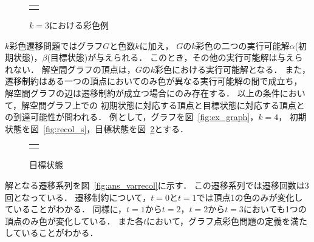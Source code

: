 \begin{figure}[htbp]
  \centering
  \begin{tabular}{c}
    
    \begin{minipage}{0.45\hsize}
      \centering
      
      \caption{グラフ}
      \label{fig:ex_graph}
    \end{minipage}

    \begin{minipage}{0.45\hsize}
      \centering
      
      \caption{$k=3$における彩色例}
      \label{fig:graph_col}
    \end{minipage}

  \end{tabular}  
\end{figure}

$k$彩色遷移問題ではグラフ$G$と色数$k$に加え，
$G$の$k$彩色の二つの実行可能解$\alpha$(初期状態)，$\beta$(目標状態)が与えられる． 
このとき，その他の実行可能解は与えられない． 
解空間グラフの頂点は，$G$の$k$彩色における実行可能解となる．
また，遷移制約はある一つの頂点においてのみ色が異なる実行可能解の間で成立ち，
解空間グラフの辺は遷移制約が成立つ場合にのみ存在する．
以上の条件において，解空間グラフ上での
初期状態に対応する頂点と目標状態に対応する頂点との到達可能性が問われる． 
例として，グラフを図~\ref{fig:ex_graph}，$k=4$，
初期状態を図~\ref{fig:recol_s}，目標状態を図~\ref{fig:recol_g}とする．

\begin{figure}[htbp]
  \centering
  \begin{tabular}{c}

    \begin{minipage}{0.45\hsize}
      \centering
      
      \caption{初期状態}
      \label{fig:recol_s}
    \end{minipage}

    \begin{minipage}{0.45\hsize}
      \centering
      
      \caption{目標状態}
      \label{fig:recol_g}
    \end{minipage}
    
  \end{tabular}
\end{figure}

解となる遷移系列を図~\ref{fig:ans_varrecol}に示す．
この遷移系列では遷移回数は3回となっている．
遷移制約について，$t=0$と$t=1$では頂点1の色のみが変化していることがわかる． 
同様に，$t=1$から$t=2$，$t=2$から$t=3$においても1つの頂点のみ色が変化している． 
また各$t$において，グラフ点彩色問題の定義を満たしていることがわかる．


